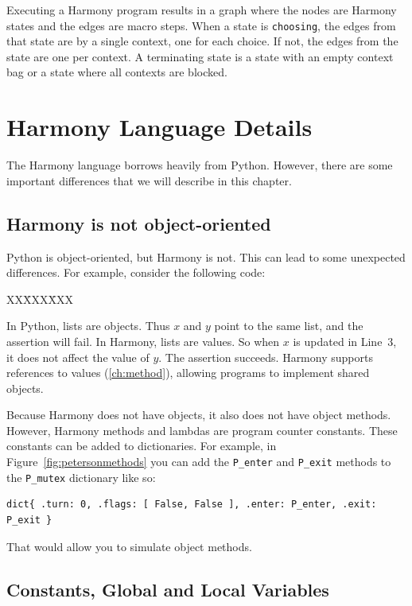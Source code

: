 \documentclass{report}
\newcommand{\harmonysource}[1]{
\begin{tabbing}
XX\=XXX\=XXX\kill
    
\end{tabbing}
}
\newenvironment{code}{
\tcolorbox
}{
\endtcolorbox
}
\begin{document}
Executing a Harmony program results in a graph where the nodes are Harmony
states and the edges are macro steps.
When a state is \texttt{choosing}, the edges from that state are
by a single context, one for each choice.  If not, the edges from
the state are one per context.
A terminating state is a state with an empty context bag or a state
where all contexts are blocked.

\chapter{Harmony Language Details}

The Harmony language borrows heavily from Python.  However, there are
some important differences that we will describe in this chapter.

\section{Harmony is not object-oriented}

Python is object-oriented, but Harmony is not.  This can lead to some
unexpected differences.  For example, consider the following code:

\begin{code}
\harmonysource{oo}
\end{code}

In Python, lists are objects.  Thus $x$ and $y$ point to the same list,
and the assertion will fail.
In Harmony, lists are values.  So when $x$ is updated in Line~3, it does
not affect the value of $y$.  The assertion succeeds.
Harmony supports references to values (\autoref{ch:method}),
allowing programs to implement shared objects.

Because Harmony does not have objects, it also does not have object methods.
However, Harmony methods and lambdas are program counter constants.
These constants can be added to dictionaries.
For example, in Figure~\ref{fig:petersonmethods}
you can add the \texttt{P\_enter} and
\texttt{P\_exit} methods to the \texttt{P\_mutex} dictionary
like so:
\begin{code}
\begin{verbatim}
dict{ .turn: 0, .flags: [ False, False ], .enter: P_enter, .exit: P_exit }
\end{verbatim}
\end{code}
That would allow you to simulate object methods.

\section{Constants, Global and Local Variables}
\end{document}
